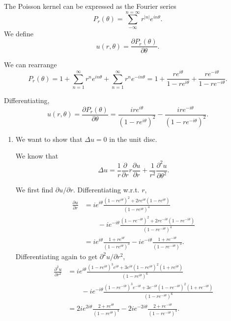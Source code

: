 \documentclass[paperoneside]{article}
\newcommand\abs[1]{{\left|#1\right|}}
\begin{document}
  The Poisson kernel can be expressed as the Fourier series\[
    P_r(\theta) = \sum_{-\infty}^{n=\infty} r^\abs{n} e^{in\theta} \text{.}
  \] We define \[
    u(r, \theta) = \frac{\partial P_r(\theta)}{\partial \theta} \text{.}
  \]

  We can rearrange\[
    P_r(\theta)
    = 1 + \sum_{n=1}^\infty r^n e^{in\theta} + \sum_{n=1}^\infty r^n e^{-in\theta}
    = 1 + \frac{r e^{i\theta}}{1-re^{i\theta}} + \frac{r e^{-i\theta}}{1-re^{-i\theta}} \text{.}
  \]

  Differentiating,\[
    u(r, \theta)
    = \frac{\partial P_r(\theta)}{\partial\theta}
    = \frac{ire^{i\theta}}{\left(1-re^{i\theta}\right)^2}
    - \frac{ir e^{-i\theta}}{\left(1-re^{-i\theta}\right)^2} \text{.}
  \]

  \begin{enumerate}[label=(\roman*)]
    \item We want to show that $\Delta u = 0$ in the unit disc.

    We know that \[
      \Delta u
      = \frac1r\frac\partial{\partial r}r\frac{\partial u}{\partial r}
      + \frac1{r^2}\frac{\partial^2 u}{\partial \theta^2} \text{.}
    \]

    We first find $\partial u/\partial r$. Differentiating w.r.t. $r$,\begin{align*}
      \frac{\partial u}{\partial r}
      &= ie^{i\theta}\frac{(1-re^{i\theta})^2+2re^{i\theta}(1-re^{i\theta})}{(1-re^{i\theta})^4} \\
      &\qquad- ie^{-i\theta}\frac{(1-re^{-i\theta})^2+2re^{-i\theta}(1-re^{-i\theta})}{(1-re^{-i\theta})^4} \\
      &= ie^{i\theta}\frac{1+re^{i\theta}}{(1-re^{i\theta})^3} 
      - ie^{-i\theta}\frac{1+re^{-i\theta}}{(1-re^{-i\theta})^3} \text{.}
    \end{align*} Differentiating again to get $\partial^2 u/\partial r^2$,\begin{align*}
      \frac{\partial^2 u}{\partial r^2}
      &= ie^{i\theta}\frac{(1-re^{i\theta})^3e^{i\theta} + 3e^{i\theta}(1-re^{i\theta})^2(1+re^{i\theta})}{(1-re^{i\theta})^6} \\
      &\qquad- ie^{-i\theta}\frac{(1-re^{-i\theta})^3e^{-i\theta} + 3e^{-i\theta}(1-re^{-i\theta})^2(1+re^{-i\theta})}{(1-re^{-i\theta})^6} \\
      &= 2ie^{2i\theta}\frac{2+re^{i\theta}}{(1-re^{i\theta})^4}
      - 2ie^{-2i\theta}\frac{2+re^{-i\theta}}{(1-re^{-i\theta})^4} \text{.}
    \end{align*}


\end{enumerate}
\end{document}
